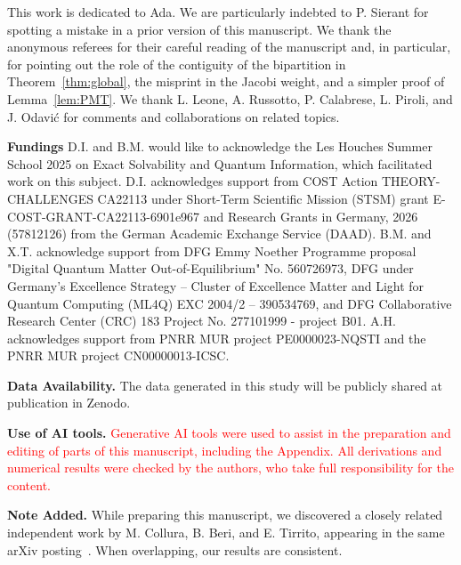 \documentclass[prx,twocolumn,superscriptaddress,aps,10pt, frontmatterverbose, reprint,footinbib,longbibliography=true]{revtex4-2}
\newcommand{\rev}[1]{\textcolor{red}{#1}}
\begin{document}
\begin{acknowledgments}
This work is dedicated to Ada. We are particularly indebted to P. Sierant for spotting a mistake in a prior version of this manuscript. We thank the anonymous referees for their careful reading of the manuscript and, in particular, for pointing out the role of the contiguity of the bipartition in Theorem~\ref{thm:global}, the misprint in the Jacobi weight, and a simpler proof of Lemma~\ref{lem:PMT}. 
We thank L. Leone, A. Russotto, P. Calabrese, L. Piroli, and J. Odavić for comments and collaborations on related topics.

\textbf{Fundings}
D.I. and B.M. would like to acknowledge the Les Houches Summer School 2025 on Exact Solvability and Quantum Information, which facilitated work on this subject.
D.I. acknowledges support from COST Action THEORY-CHALLENGES CA22113 under Short-Term Scientific Mission (STSM) grant E-COST-GRANT-CA22113-6901e967 and Research Grants in Germany, 2026 (57812126) from the German Academic Exchange Service (DAAD).  
B.M. and X.T. acknowledge support from DFG Emmy Noether Programme proposal "Digital Quantum Matter Out-of-Equilibrium" No. 560726973, DFG under Germany's Excellence Strategy – Cluster of Excellence Matter and Light for Quantum Computing (ML4Q) EXC 2004/2 – 390534769, and DFG Collaborative Research Center (CRC) 183 Project No. 277101999 - project B01. 
A.H. acknowledges support from  PNRR MUR project PE0000023-NQSTI and the PNRR MUR project CN00000013-ICSC.

\textbf{Data Availability.} The data generated in this study will be publicly shared at publication in Zenodo.

\textbf{Use of AI tools.} \rev{Generative AI tools were used to assist in the preparation and editing of parts of this manuscript, including the Appendix. All derivations and numerical results were checked by the authors, who take full responsibility for the content.}



\textbf{Note Added.}
While preparing this manuscript, we discovered a closely related independent work by M. Collura, B. Beri, and E. Tirrito, appearing in the same arXiv posting~\cite{collura2026nonlocalnonstabilizernessfreefermion}. 
When overlapping, our results are consistent.
\end{acknowledgments}
\clearpage
\end{document}
